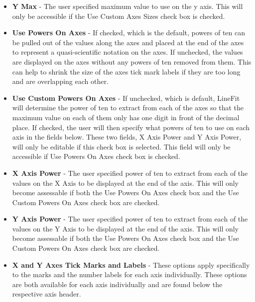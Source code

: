 \documentclass[titlepage,12pt]{article}
\begin{document}
\begin{itemize}
\item \textbf{Y Max} - The user specified maximum value to use on the y axis. This will only be accessible if the Use Custom Axes Sizes check box is checked.
\item \textbf{Use Powers On Axes} - If checked, which is the default, powers of ten can be pulled out of the values along the axes and placed at the end of the axes to represent a quasi-scientific notation on the axes. If unchecked, the values are displayed on the axes without any powers of ten removed from them. This can help to shrink the size of the axes tick mark labels if they are too long and are overlapping each other.
\item \textbf{Use Custom Powers On Axes} - If unchecked, which is default, LineFit will determine the power of ten to extract from each of the axes so that the maximum value on each of them only has one digit in front of the decimal place. If checked, the user will then specify what powers of ten to use on each axis in the fields below. These two fields, X Axis Power and Y Axis Power, will only be editable if this check box is selected. This field will only be accessible if Use Powers On Axes check box is checked.
\item \textbf{X Axis Power} - The user specified power of ten to extract from each of the values on the X Axis to be displayed at the end of the axis. This will only become assessable if both the Use Powers On Axes check box and the Use Custom Powers On Axes check box are checked.
\item \textbf{Y Axis Power} - The user specified power of ten to extract from each of the values on the Y Axis to be displayed at the end of the axis. This will only become assessable if both the Use Powers On Axes check box and the Use Custom Powers On Axes check box are checked.
\item \textbf{X and Y Axes Tick Marks and Labels} - These options apply specifically to the marks and the number labels for each axis individually. These options are both available for each axis individually and are found below the respective axis header.


\end{itemize}
\end{document}
